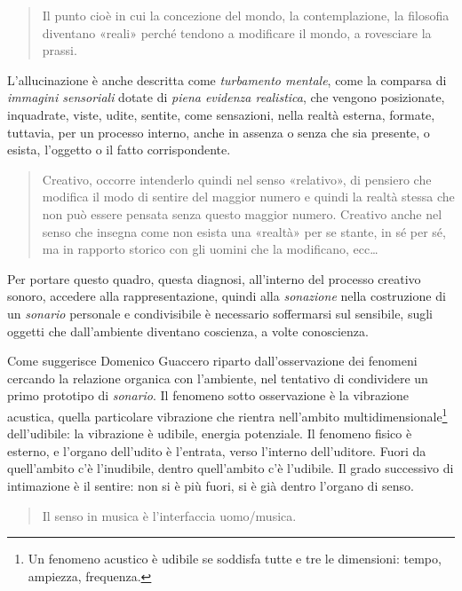\documentclass{../../lib/gs}
\begin{document}
\begin{quote}
  Il punto cioè in cui la concezione del mondo, la contemplazione, la filosofia
  diventano «reali» perché tendono a modificare il mondo, a rovesciare la prassi.
  \cite{ag:matst}
\end{quote}%

L'allucinazione è anche descritta come \emph{turbamento mentale}, come la
comparsa di \emph{immagini sensoriali} dotate di \emph{piena evidenza realistica},
che vengono posizionate, inquadrate, viste, udite, sentite, come sensazioni,
nella realtà esterna, formate, tuttavia, per un processo interno, anche in
assenza o senza che sia presente, o esista, l'oggetto o il fatto corrispondente.

\begin{quote}
  Creativo, occorre intenderlo quindi nel senso «relativo», di pensiero che
  modifica il modo di sentire del maggior numero e quindi la realtà stessa che
  non può essere pensata senza questo maggior numero. Creativo anche nel senso
  che insegna come non esista una «realtà» per se stante, in sé per sé, ma in
  rapporto storico con gli uomini che la modificano, ecc\ldots \cite{ag:matst}
\end{quote}%

Per portare questo quadro, questa diagnosi, all'interno del processo creativo
sonoro, accedere alla rappresentazione, quindi alla \emph{sonazione} nella
costruzione di un \emph{sonario} personale e condivisibile è necessario
soffermarsi sul sensibile, sugli oggetti che dall'ambiente diventano coscienza,
a volte conoscienza.

Come suggerisce Domenico Guaccero \cite{branchi1977tecnologia} riparto
dall'osservazione dei fenomeni cercando la relazione organica con
l'ambiente, nel tentativo di condividere un primo prototipo di \emph{sonario}.
Il fenomeno sotto osservazione è la vibrazione acustica, quella particolare
vibrazione che rientra nell'ambito multidimensionale\footnote{%
  Un fenomeno acustico è udibile se soddisfa tutte e tre le dimensioni: tempo,
  ampiezza, frequenza.
} dell'udibile: la vibrazione è udibile, energia potenziale. Il fenomeno fisico
è esterno, e l'organo dell'udito è l'entrata, verso l'interno dell'uditore.
Fuori da quell'ambito c'è l'inudibile, dentro quell'ambito c'è l'udibile. Il
grado successivo di intimazione è il sentire: non si è più fuori, si è già
dentro l'organo di senso.

\begin{quote}
  Il senso in musica è l'interfaccia uomo/musica. \cite{stefani}
\end{quote}
\end{document}
